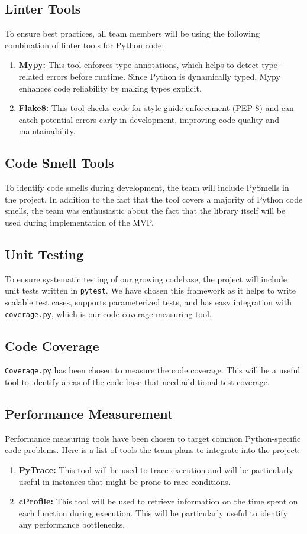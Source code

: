 \documentclass{article}
\begin{document}
\subsection{Linter Tools}
To ensure best practices, all team members will be using the following combination of linter tools for Python code:
\begin{enumerate}
    \item \textbf{Mypy:} This tool enforces type annotations, which helps to detect type-related errors before runtime. Since Python is dynamically typed, Mypy enhances code reliability by making types explicit.
    \item \textbf{Flake8:} This tool checks code for style guide enforcement (PEP 8) and can catch potential errors early in development, improving code quality and maintainability.
\end{enumerate}

\subsection{Code Smell Tools}
To identify code smells during development, the team will include PySmells in the project. In addition to the fact that the tool covers a majority of Python code smells, the team was enthusiastic about the fact that the library itself will be used during implementation of the MVP.

\subsection{Unit Testing}
To ensure systematic testing of our growing codebase, the project will include unit tests written in \texttt{pytest}. We have chosen this framework as it helps to write scalable test cases, supports parameterized tests, and has easy integration with \texttt{coverage.py}, which is our code coverage measuring tool.

\subsection{Code Coverage}
\texttt{Coverage.py} has been chosen to measure the code coverage. This will be a useful tool to identify areas of the code base that need additional test coverage.

\subsection{Performance Measurement}
Performance measuring tools have been chosen to target common Python-specific code problems. Here is a list of tools the team plans to integrate into the project:
\begin{enumerate}
    \item \textbf{PyTrace:} This tool will be used to trace execution and will be particularly useful in instances that might be prone to race conditions.
    \item \textbf{cProfile:} This tool will be used to retrieve information on the time spent on each function during execution. This will be particularly useful to identify any performance bottlenecks.
\end{enumerate}
\end{document}
